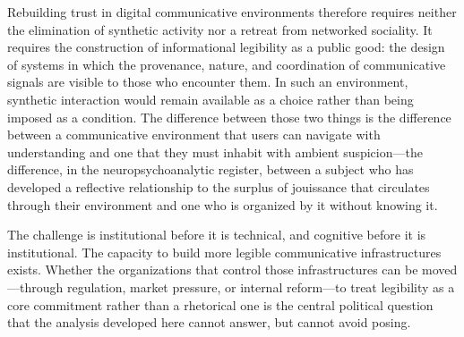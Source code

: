 \documentclass[12pt,a4paper]{article}
\begin{document}
Rebuilding trust in digital communicative environments therefore requires neither the elimination
of synthetic activity nor a retreat from networked sociality. It requires the construction of
informational legibility as a public good: the design of systems in which the provenance, nature,
and coordination of communicative signals are visible to those who encounter them. In such an
environment, synthetic interaction would remain available as a choice rather than being imposed
as a condition. The difference between those two things is the difference between a communicative
environment that users can navigate with understanding and one that they must inhabit with
ambient suspicion---the difference, in the neuropsychoanalytic register, between a subject who
has developed a reflective relationship to the surplus of jouissance that circulates through
their environment and one who is organized by it without knowing it.

The challenge is institutional before it is technical, and cognitive before it is institutional.
The capacity to build more legible communicative infrastructures exists. Whether the
organizations that control those infrastructures can be moved---through regulation, market
pressure, or internal reform---to treat legibility as a core commitment rather than a rhetorical
one is the central political question that the analysis developed here cannot answer, but cannot
avoid posing.

\newpage


\end{document}
